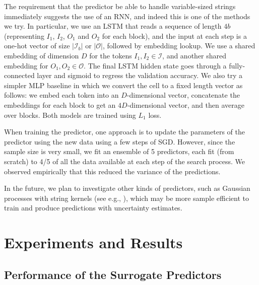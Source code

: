\documentclass[runningheads]{llncs}
\begin{document}
The requirement that the predictor be able to handle variable-sized strings 
immediately suggests the use of an RNN, and indeed this is one of the methods we try.
In particular, we use an LSTM that reads a sequence of length $4b$
(representing $I_1$, $I_2$, $O_1$ and $O_2$ for each block), and the input at each step is a one-hot vector of size $|\mathcal{I}_b|$ or $|\mathcal{O}|$, followed by embedding lookup.
We use a shared embedding of dimension $D$ for the tokens $I_1, I_2 \in \mathcal{I}$,
and another shared embedding for $O_1, O_2 \in \mathcal{O}$.
The final LSTM hidden state goes through a fully-connected layer and sigmoid to regress the validation accuracy. 
We also try a simpler MLP baseline in which we convert the cell to a fixed length vector as follows:
we embed each token into an $D$-dimensional vector,
concatenate the embeddings for each block to get an $4D$-dimensional vector,
and then average over blocks.
Both models are trained using $L_1$ loss.


When training the predictor,
one approach is to
update the parameters of the predictor using the new data
using a few steps of SGD.
However, since the sample size is very small, we fit
an ensemble of 5 predictors, each fit (from scratch)
to 4/5 of all the data available at each step of the search process.
We observed empirically that this reduced the variance of the predictions.


In the future, we plan to investigate other kinds of predictors,
such as Gaussian processes with string kernels (see e.g., \cite{Baisero2015}),
which may be more sample efficient to train and produce predictions with uncertainty estimates.


\section{Experiments and Results}\label{sec:results}\subsection{Performance of the Surrogate Predictors}\label{sec:predictor}
\end{document}
